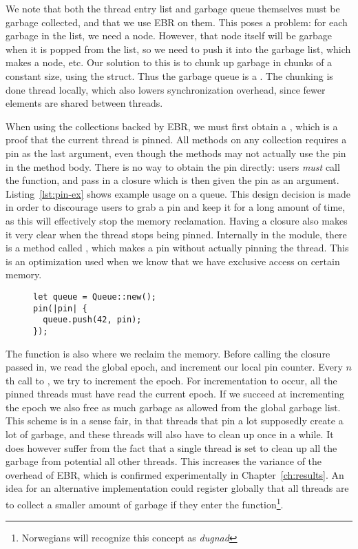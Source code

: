 \documentclass[b5paper]{report}
\begin{document}
We note that both the thread entry list and garbage queue themselves must be garbage
collected, and that we use EBR on them. This poses a problem: for each
garbage in the list, we need a node. However, that node itself will be garbage
when it is popped from the list, so we need to push it into the garbage list,
which makes a node, etc. Our solution to this is to chunk up garbage in chunks
of a constant size, using the  struct. Thus the garbage queue is a
. The chunking is done thread locally, which also
lowers synchronization overhead, since fewer elements are shared between threads.

When using the collections backed by EBR, we must first obtain a ,
which is a proof that the current thread is pinned. All methods on any
collection requires a pin as the last argument, even though the methods may not
actually use the pin in the method body. There is no way to obtain the pin
directly: users \emph{must} call the  function, and pass in a closure
which is then given the pin as an argument. Listing~\ref{lst:pin-ex} shows
example usage on a queue. This design decision is made in order to discourage
users to grab a pin and keep it for a long amount of time, as this will
effectively stop the memory reclamation. Having a closure also makes it very
clear when the thread stops being pinned. Internally in the  module,
there is a method called , which makes a pin without actually
pinning the thread. This is an optimization used when we know that we have
exclusive access on certain memory.

\begin{figure}[ht!]
\begin{lstlisting}[caption=Example usage of the \code{pin} fucntion,
label=lst:pin-ex,numbers=none]
let queue = Queue::new();
pin(|pin| {
  queue.push(42, pin);
});
\end{lstlisting}
\end{figure}

The  function is also where we reclaim the memory. Before calling the
closure passed in, we read the global epoch, and increment our local pin
counter. Every $n$th call to , we try to increment the epoch. For
incrementation to occur, all the pinned threads must have read the current
epoch.  If we succeed at incrementing the epoch we also free as much garbage as
allowed from the global garbage list. This scheme is in a sense fair, in that
threads that pin a lot supposedly create a lot of garbage, and these threads
will also have to clean up once in a while. It does however suffer from the fact
that a single thread is set to clean up all the garbage from potential all
other threads.  This increases the variance of the overhead of EBR, which is
confirmed experimentally in Chapter~\ref{ch:results}. An idea for an
alternative implementation could register globally that all threads are to
collect a smaller amount of garbage if they enter the 
function\footnote{Norwegians will recognize this concept as \emph{dugnad}}.
\end{document}
